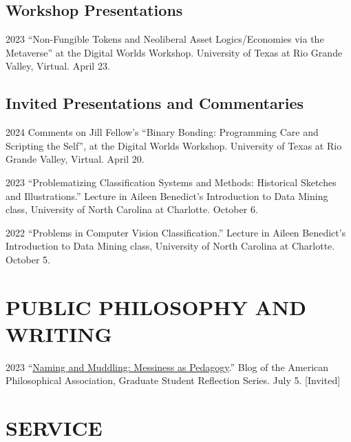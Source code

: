 \documentclass{article}
\begin{document}
\subsection*{\normalsize{Workshop Presentations}}
\begin{tablist}
    \item[2023] \tab{}\enquote{Non-Fungible Tokens and Neoliberal Asset Logics/Economies via the Metaverse} at the Digital Worlds Workshop. University of Texas at Rio Grande Valley, Virtual. April 23.
\end{tablist}
\subsection*{\normalsize{Invited Presentations and Commentaries}}
\begin{tablist}
    \item[2024] \tab{}Comments on Jill Fellow's \enquote{Binary Bonding: Programming Care and Scripting the Self}, at the Digital Worlds Workshop. University of Texas at Rio Grande Valley, Virtual. April 20.
    \item[2023] \tab{}\enquote{Problematizing Classification Systems and Methods: Historical Sketches and Illustrations.} Lecture in Aileen Benedict's Introduction to Data Mining class, University of North Carolina at Charlotte. October 6.
    \item[2022] \tab{}\enquote{Problems in Computer Vision Classification.} Lecture in Aileen Benedict's Introduction to Data Mining class, University of North Carolina at Charlotte. October 5.
\end{tablist}

\section*{\normalsize{PUBLIC PHILOSOPHY AND WRITING}}
\begin{tablist}
    \item[2023] \tab{}\enquote{\href{https://blog.apaonline.org/2023/07/05/naming-and-muddling-messiness-as-pedagogy/}{Naming and Muddling: Messiness as Pedagogy}.} Blog of the American Philosophical Association, Graduate Student Reflection Series. July 5. [Invited]
\end{tablist}

\section*{\normalsize{SERVICE}}
\end{document}
